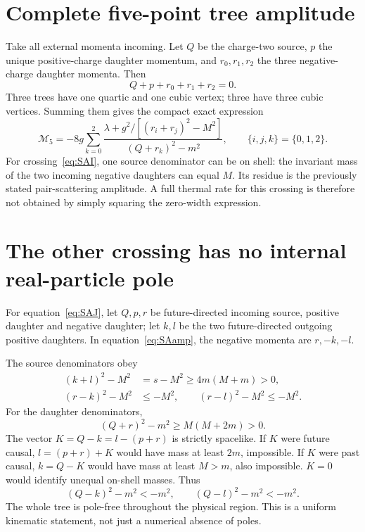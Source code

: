 \documentclass[11pt]{article}
\begin{document}
\section{Complete five-point tree amplitude}
Take all external momenta incoming. Let $Q$ be the charge-two source,
$p$ the unique positive-charge daughter momentum, and
$r_0,r_1,r_2$ the three negative-charge daughter momenta. Then
\begin{equation}
 Q+p+r_0+r_1+r_2=0.
\end{equation}
Three trees have one quartic and one cubic vertex; three have three cubic
vertices. Summing them gives the compact exact expression
\begin{equation}
 \boxed{\mathcal M_5=-8g\sum_{k=0}^2
 \frac{\lambda+g^2/[(r_i+r_j)^2-M^2]}
 {(Q+r_k)^2-m^2},\qquad \{i,j,k\}=\{0,1,2\}.}
\label{eq:SAamp}
\end{equation}
For crossing~\eqref{eq:SAI}, one source denominator can be on shell:
the invariant mass of the two incoming negative daughters can equal $M$.
Its residue is the previously stated pair-scattering amplitude. A full
thermal rate for this crossing is therefore not obtained by simply squaring
the zero-width expression.

\section{The other crossing has no internal real-particle pole}
For equation~\eqref{eq:SAJ}, let $Q,p,r$ be future-directed incoming
source, positive daughter and negative daughter; let $k,l$ be the two
future-directed outgoing positive daughters. In equation~\eqref{eq:SAamp},
the negative momenta are $r,-k,-l$.

The source denominators obey
\begin{align}
 (k+l)^2-M^2&=s-M^2\ge4m(M+m)>0,\\
 (r-k)^2-M^2&\le-M^2,\qquad
 (r-l)^2-M^2\le-M^2.
\end{align}
For the daughter denominators,
\begin{equation}
 (Q+r)^2-m^2\ge M(M+2m)>0.
\end{equation}
The vector $K=Q-k=l-(p+r)$ is strictly spacelike. If $K$ were future
causal, $l=(p+r)+K$ would have mass at least $2m$, impossible. If $K$
were past causal, $k=Q-K$ would have mass at least $M>m$, also impossible.
$K=0$ would identify unequal on-shell masses. Thus
\begin{equation}
 (Q-k)^2-m^2<-m^2,\qquad (Q-l)^2-m^2<-m^2.
\end{equation}
The whole tree is pole-free throughout the physical region. This is a
uniform kinematic statement, not just a numerical absence of poles.
\end{document}
